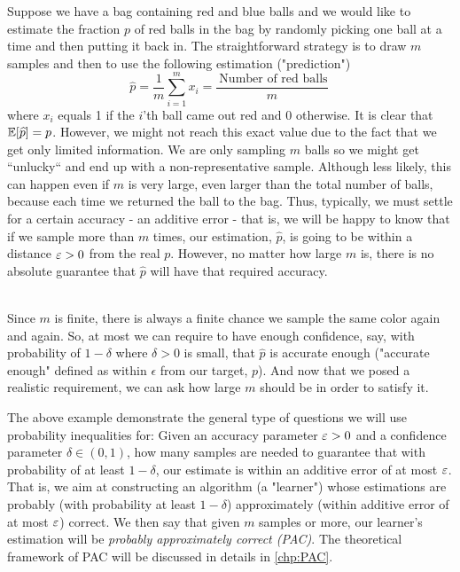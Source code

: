 \begin{example}
Suppose we have a bag containing red and blue balls and we would like to estimate the fraction $p$ of red balls in the bag by randomly picking one ball at a time and then putting it back in. The straightforward strategy is to draw $m$ samples and then to use the following estimation ("prediction")
\[
\widehat{p} =  \frac{1}{m}\sum_{i=1}^{m}x_i =\frac{ ~\text{Number of red balls}}{m}~
\]
where $x_i$ equals 1 if the $i$'th ball came out red and 0 otherwise. 
It is clear that $\mathbb{E} [\widehat{p}] = p$. However, we might not reach this exact value due to the fact that we get only limited information. We are only sampling $m$ balls so we might get ``unlucky`` and end up with a non-representative sample. Although less likely, this can happen even if $m$ is very large, even larger than the total number of balls, because each time we returned the ball to the bag. Thus, typically, we must settle for a certain accuracy - an additive error - that is, we will be happy to know that if we sample more than $m$ times, our estimation,  $\widehat{p}$, is going to be within a distance $\varepsilon>0$ from the real $p$. However, no matter how large $m$ is, there is no absolute guarantee that  $\widehat{p}$ will have that required accuracy.

~\\Since $m$ is finite, there is always a finite chance we sample the same color again and again.  So, at most we can require to have enough confidence, say, with probability of $1-\delta$ where $\delta>0$ is small, that $\hat{p}$ is accurate enough ("accurate enough" defined as within  $\epsilon$ from our target, $p$). And now that we posed a realistic requirement, we can ask how large $m$ should be in order  to satisfy it.
\end{example}

The above example demonstrate the general type of questions we will use probability inequalities for: Given an accuracy parameter $\varepsilon > 0$ and a confidence
parameter $\delta \in \left(0,1\right)$, how many samples are needed to guarantee that with probability of at least $1- \delta$, our estimate is within an additive error of at most $\varepsilon$. That is, we aim at constructing an algorithm (a "learner") whose estimations are probably (with probability at least $1-\delta$) approximately (within additive error of at most $\varepsilon$) correct. We then say that given $m$ samples or more,  our learner's estimation will be  \emph{probably approximately correct (PAC)}. The theoretical framework of PAC will be discussed in details in \autoref{chp:PAC}.

